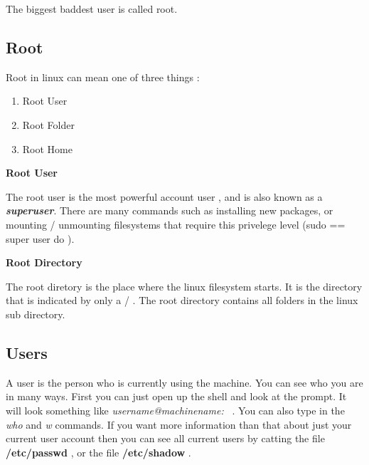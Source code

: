 The biggest baddest user is called root.

\vspace{0.5cm}

\subsection{Root}
\label{ssec:root}

Root in linux can mean one of three things : 

\noindent



\begin{enumerate}[noitemsep]

	\item Root User
	\item Root Folder
	\item Root Home

\end{enumerate}


\noindent
\textbf{Root User}


\noindent
The root user is the most powerful account user , and is also known as a
\textbf{\textit{superuser}}. There are many commands such as installing new
packages, or mounting / unmounting filesystems that require this privelege level (sudo == super user do ). 


\noindent 
\textbf{Root Directory}


\noindent
The root diretory is the place where the linux filesystem starts. It is the
directory that is indicated by only a / . The root directory contains all
folders in the linux sub directory.

\subsectionend

\subsectionend

\subsection{Users}
\label{ssec:users}

A user is the person who is currently using the machine. You can see who you are
in many ways. First you can just open up the shell and look at the prompt. It
will look something like \textit{username@machinename:~} . You can also type in
the \textit{who} and \textit{w} commands. If you want more information than that
about just your current user account then you can see all current users by
catting the file \textbf{/etc/passwd} , or the file \textbf{/etc/shadow} .

